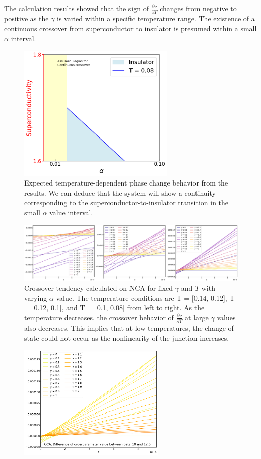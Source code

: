 \documentclass{article}[12pt]
\begin{document}
\begin{spacing}{1.5}
  The calculation results showed that the sign of $\frac{\partial \nu}{\partial T}$ changes from negative to positive 
as the $\gamma$ is varied within a specific temperature range. The existence of a continuous crossover from superconductor 
to insulator is presumed within a small $\alpha$ interval.
\begin{figure}[H]
  \centerline{\includegraphics[width=7.5cm]{TexFigure/4/4_3_12_smallalp.png}}
  \caption{Expected temperature-dependent phase change behavior from the results.
  We can deduce that the system will show a continuity corresponding to the superconductor-to-insulator transition in the small $\alpha$ value interval.}
\end{figure}
\pagebreak
\vfill
\begin{figure}[H]
  \vfill
  \centerline{\includegraphics[width=17cm]{TexFigure/4/4_3_13_litlalp_1.png}}
  \caption{Crossover tendency calculated on NCA for fixed $\gamma$ and $T$ with varying $\alpha$ value. The temperature conditions are T = [0.14, 0.12], T = [0.12, 0.1], and T = [0.1, 0.08] 
  from left to right. As the temperature decreases, the crossover behavior of $\frac{\partial \nu}{\partial T}$ 
  at large $\gamma$ values also decreases. This implies that at low temperatures, the change of state could not occur 
  as the nonlinearity of the junction increases.}
\end{figure}
\begin{figure}[H]
  \centerline{\includegraphics[width=7cm]{TexFigure/4/4_3_14_Diff_Os3_b_10_12.5_n.png}}

\end{figure}
\end{spacing}
\end{document}
